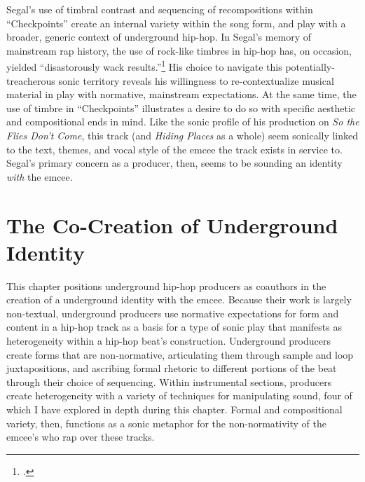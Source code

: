 Segal's use of timbral contrast and sequencing of recompositions within ``Checkpoints'' create an internal variety within the song form, and play with a broader, generic context of underground hip-hop. In Segal's memory of mainstream rap history, the use of rock-like timbres in hip-hop has, on occasion, yielded ``disastorously wack results.''\footnote{\cite{backwoodzhiphopKennySegalPresents2019}.} His choice to navigate this potentially-treacherous sonic territory reveals his willingness to re-contextualize musical material in play with normative, mainstream expectations. At the same time, the use of timbre in ``Checkpoints'' illustrates a desire to do so with specific aesthetic and compositional ends in mind. Like the sonic profile of his production on \textit{So the Flies Don't Come}, this track (and \textit{Hiding Places} as a whole) seem sonically linked to the text, themes, and vocal style of the emcee the track exists in service to. Segal's primary concern as a producer, then, seems to be sounding an identity \emph{with} the emcee.

\section{The Co-Creation of Underground Identity}

This chapter positions underground hip-hop producers as coauthors in the creation of a underground identity with the emcee. Because their work is largely non-textual, underground producers use normative expectations for form and content in a hip-hop track as a basis for a type of sonic play that manifests as heterogeneity within a hip-hop beat's construction. Underground producers create forms that are non-normative, articulating them through sample and loop juxtapositions, and ascribing formal rhetoric to different portions of the beat through their choice of sequencing. Within instrumental sections, producers create heterogeneity with a variety of techniques for manipulating sound, four of which I have explored in depth during this chapter. Formal and compositional variety, then, functions as a sonic metaphor for the non-normativity of the emcee's who rap over these tracks.